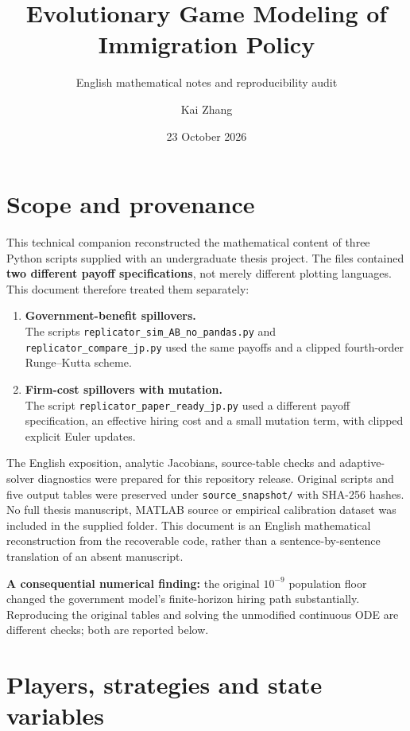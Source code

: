 \documentclass[
  11pt,
  letterpaper,
]{article}
\title{Evolutionary Game Modeling of Immigration Policy}
\subtitle{English mathematical notes and reproducibility audit}
\author{Kai Zhang}
\date{23 October 2026}
\providecommand{\tightlist}{%
  \setlength{\itemsep}{0pt}\setlength{\parskip}{0pt}}
\begin{document}
\maketitle

{
\setcounter{tocdepth}{3}
\tableofcontents
}
\section{Scope and provenance}\label{scope-and-provenance}

This technical companion reconstructed the mathematical content of three
Python scripts supplied with an undergraduate thesis project. The files
contained \textbf{two different payoff specifications}, not merely
different plotting languages. This document therefore treated them
separately:

\begin{enumerate}
\def\labelenumi{\arabic{enumi}.}
\tightlist
\item
  \textbf{Government-benefit spillovers.}\\
  The scripts \texttt{replicator\_sim\_AB\_no\_pandas.py} and
  \texttt{replicator\_compare\_jp.py} used the same payoffs and a
  clipped fourth-order Runge--Kutta scheme.
\item
  \textbf{Firm-cost spillovers with mutation.}\\
  The script \texttt{replicator\_paper\_ready\_jp.py} used a different
  payoff specification, an effective hiring cost and a small mutation
  term, with clipped explicit Euler updates.
\end{enumerate}

The English exposition, analytic Jacobians, source-table checks and
adaptive-solver diagnostics were prepared for this repository release.
Original scripts and five output tables were preserved under
\texttt{source\_snapshot/} with SHA-256 hashes. No full thesis
manuscript, MATLAB source or empirical calibration dataset was included
in the supplied folder. This document is an English mathematical
reconstruction from the recoverable code, rather than a
sentence-by-sentence translation of an absent manuscript.

\textbf{A consequential numerical finding:} the original \(10^{-9}\)
population floor changed the government model's finite-horizon hiring
path substantially. Reproducing the original tables and solving the
unmodified continuous ODE are different checks; both are reported below.

\section{Players, strategies and state
variables}\label{players-strategies-and-state-variables}
\end{document}

